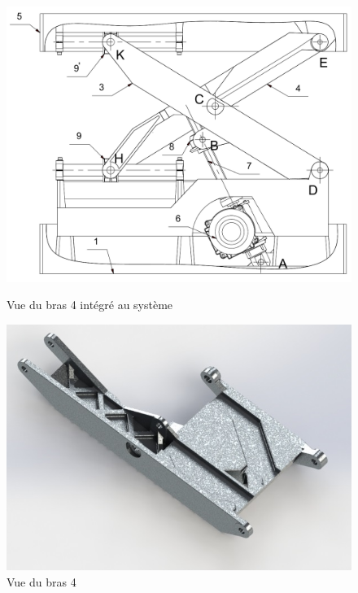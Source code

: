 \begin{figure}[htbp]
\begin{minipage}[c]{.5\linewidth}
\begin{center}
\includegraphics[width=\linewidth]{img/face.png}
\caption{Vue du bras 4 intégré au système}
\label{fig:image5}
\end{center}
\end{minipage}
\hfill
\begin{minipage}[c]{.45\linewidth}
\begin{center}
\includegraphics[width=0.9\linewidth]{img/Bras}
\caption{Vue du bras 4}
\label{fig:image55}
\end{center}
\end{minipage}
\end{figure}


